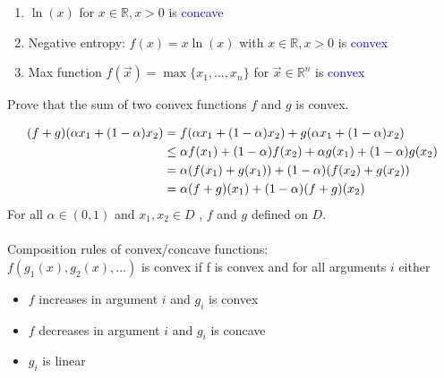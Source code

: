 \begin{solution}[print=true]
\begin{enumerate}[label=\emph{\alph*)}]
\item $\ln(x)$ for $x\in \mathbb{R}, x>0$ is \textcolor{blue}{concave}
\item Negative entropy: $f(x) = x \ln(x)$ with $x\in \mathbb{R}, x> 0$ is \textcolor{blue}{convex}
\item Max function $f(\vec{x}) = \max\{x_1, \dots , x_n\}$ for $\vec{x}\in \mathbb{R}^n$ is \textcolor{blue}{convex}
\end{enumerate}
\end{solution}

\begin{exercise}[subtitle={Paper}]
Prove that the sum of two convex functions $f$ and $g$ is convex.
\end{exercise}

\begin{solution}[print=true]
\begin{align}
(f+g)( \alpha x_1+(1-\alpha )x_2)
=  & \;  f( \alpha x_1+(1-\alpha )x_2) + g( \alpha x_1+(1-\alpha )x_2) \notag \\
\le  & \; \alpha f(x_1) + (1-\alpha )f(x_2) + \alpha g(x_1) + (1-\alpha )g(x_2) \notag \\
= & \; \alpha (f(x_1)+g(x_1)) + (1-\alpha)(f(x_2)+g(x_2))  \notag \\
= & \;  \alpha (f+g)(x_1) + (1- \alpha ) (f+g)(x_2) \notag
\end{align} 
For all $ \alpha \in (0,1) $ and $ x_1 , x_2 \in D $ , $f$ and $g$ defined on $D$.\\
\\
Composition rules of convex/concave functions:\\

$f(g_1(x), g_2(x), . . . )$ is convex if f is convex and for
all arguments $i$ either
\begin{itemize}
\item $f$ increases in argument $i$ and $g_i$ is convex
\item $f$ decreases in argument $i$ and $g_i$ is concave
\item $g_i$ is linear
\end{itemize}

\end{solution}


